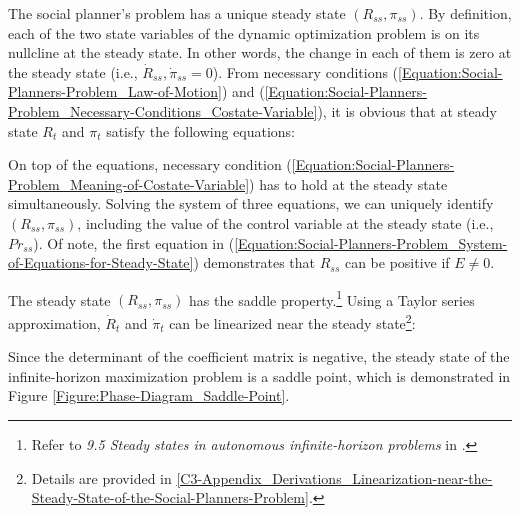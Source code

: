 The social planner's problem has a unique steady state $(R_{ss}, \pi_{ss})$. By definition, each of the two state variables of the dynamic optimization problem is on its nullcline at the steady state. In other words, the change in each of them is zero at the steady state (i.e., $\dot{R}_{ss}, \dot{\pi}_{ss} = 0$). From necessary conditions (\ref{Equation:Social-Planners-Problem_Law-of-Motion}) and (\ref{Equation:Social-Planners-Problem_Necessary-Conditions_Costate-Variable}), it is obvious that at steady state $R_{t}$ and $\pi_{t}$ satisfy the following equations:

On top of the equations, necessary condition (\ref{Equation:Social-Planners-Problem_Meaning-of-Costate-Variable}) has to hold at the steady state simultaneously. Solving the system of three equations, we can uniquely identify $(R_{ss}, \pi_{ss})$, including the value of the control variable at the steady state (i.e., $Pr_{ss}$). Of note, the first equation in (\ref{Equation:Social-Planners-Problem_System-of-Equations-for-Steady-State}) demonstrates that $R_{ss}$ can be positive if $E \neq 0$.

The steady state $(R_{ss}, \pi_{ss})$ has the saddle property.\footnote{Refer to \textit{9.5 Steady states in autonomous infinite-horizon problems} in \cite{Optimal-Control-Theory-and-Static-Optimization-in-Economics_Leonard-and-Long_1992}.} Using a Taylor series approximation, $\dot{R}_{t}$ and $\dot{\pi}_{t}$ can be linearized near the steady state\footnote{Details are provided in \ref{C3-Appendix_Derivations_Linearization-near-the-Steady-State-of-the-Social-Planners-Problem}.}:

Since the determinant of the coefficient matrix is negative, the steady state of the infinite-horizon maximization problem is a saddle point, which is demonstrated in Figure \ref{Figure:Phase-Diagram_Saddle-Point}.

